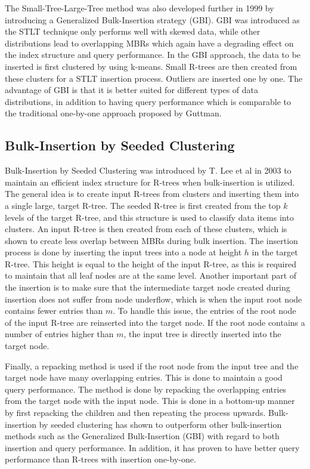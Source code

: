 \noindent
The Small-Tree-Large-Tree method was also developed further in 1999 by introducing a Generalized Bulk-Insertion strategy (GBI)\cite{GBI}. GBI was introduced as the STLT technique only performs well with skewed data, while other distributions lead to overlapping MBRs which again have a degrading effect on the index structure and query performance. In the GBI approach, the data to be inserted is first clustered by using k-means. Small R-trees are then created from these clusters for a STLT insertion process. Outliers are inserted one by one. The advantage of GBI is that it is better suited for different types of data distributions, in addition to having query performance which is comparable to the traditional one-by-one approach proposed by Guttman\cite{r-tree}.

\subsection{Bulk-Insertion by Seeded Clustering}
Bulk-Insertion by Seeded Clustering was introduced by T. Lee et al in 2003 to maintain an efficient index structure for R-trees when bulk-insertion is utilized\cite{SeededClustering}. The general idea is to create input R-trees from clusters and inserting them into a single large, target R-tree. The seeded R-tree is first created from the top $k$ levels of the target R-tree, and this structure is used to classify data items into clusters. An input R-tree is then created from each of these clusters, which is shown to create less overlap between MBRs during bulk insertion. The insertion process is done by inserting the input trees into a node at height $h$ in the target R-tree. This height is equal to the height of the input R-tree, as this is required to maintain that all leaf nodes are at the same level. Another important part of the insertion is to make sure that the intermediate target node created during insertion does not suffer from node underflow, which is when the input root node contains fewer entries than $m$. To handle this issue, the entries of the root node of the input R-tree are reinserted into the target node. If the root node contains a number of entries higher than $m$, the input tree is directly inserted into the target node.\newline

\noindent
Finally, a repacking method is used if the root node from the input tree and the target node have many overlapping entries. This is done to maintain a good query performance. The method is done by repacking the overlapping entries from the target node with the input node. This is done in a bottom-up manner by first repacking the children and then repeating the process upwards. Bulk-insertion by seeded clustering has shown to outperform other bulk-insertion methods such as the Generalized Bulk-Insertion (GBI) with regard to both insertion and query performance. In addition, it has proven to have better query performance than R-trees with insertion one-by-one\cite{SeededClustering}.

